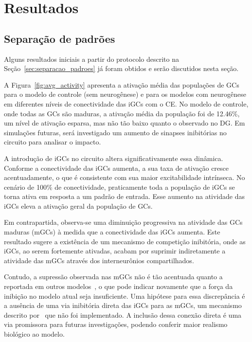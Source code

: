 \chapter{Resultados}

\section{Separação de padrões}


Alguns resultados iniciais a partir do protocolo descrito na Seção~\ref{sec:separacao_padroes} já foram obtidos e serão discutidos
nesta seção.

A Figura~\ref{fig:avg_activity} apresenta a ativação média das populações de GCs para o modelo de controle (sem neurogênese) e
para os modelos com neurogênese em diferentes níveis de conectividade das iGCs com o CE. No modelo de controle, onde todas as GCs
são maduras, a ativação média da população foi de 12.46\%, um nível de ativação esparsa, mas não tão baixo quanto o observado no
DG. Em simulações futuras, será investigado um aumento de sinapses inibitórias no circuito para analisar o impacto.

A introdução de iGCs no circuito altera significativamente essa dinâmica. Conforme a conectividade das iGCs aumenta, a sua taxa de
ativação cresce acentuadamente, o que é consistente com sua maior excitabilidade intrínseca. No cenário de 100\% de conectividade,
praticamente toda a população de iGCs se torna ativa em resposta a um padrão de entrada. Esse aumento na atividade das iGCs eleva
a ativação geral da população de GCs.

Em contrapartida, observa-se uma diminuição progressiva na atividade das GCs maduras (mGCs) à medida que a conectividade das iGCs
aumenta. Este resultado sugere a existência de um mecanismo de competição inibitória, onde as iGCs, ao serem fortemente ativadas,
acabam por suprimir indiretamente a atividade das mGCs através dos interneurônios compartilhados.

Contudo, a supressão observada nas mGCs não é tão acentuada quanto a reportada em outros modelos~\cite{kimEffect2024}, o que pode
indicar novamente que a força da inibição no modelo atual seja insuficiente. Uma hipótese para essa discrepância é a ausência de
uma via inibitória direta das iGCs para as mGCs, um mecanismo descrito por~ que não foi
implementado. A inclusão dessa conexão direta é uma via promissora para futuras investigações, podendo conferir maior realismo
biológico ao modelo.

